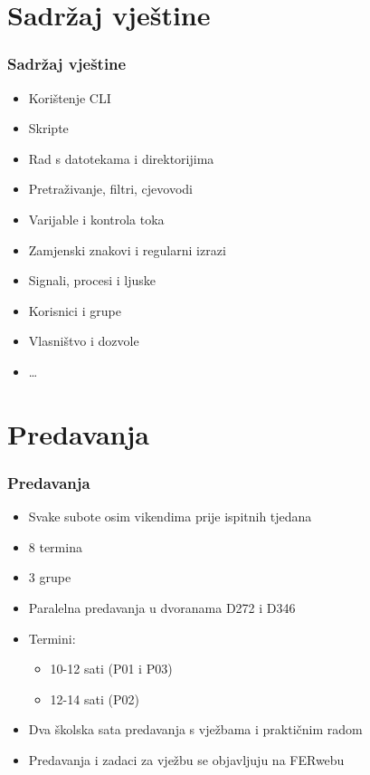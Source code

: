 \documentclass{beamer}
\begin{document}
\section{Sadržaj vještine}
\begin{frame}[t]
	\frametitle{Sadržaj vještine}
	\begin{itemize}
		\item Korištenje CLI
		\item Skripte
		\item Rad s datotekama i direktorijima
		\item Pretraživanje, filtri, cjevovodi
		\item Varijable i kontrola toka
		\item Zamjenski znakovi i regularni izrazi
		\item Signali, procesi i ljuske
		\item Korisnici i grupe
		\item Vlasništvo i dozvole
		\item \ldots
	\end{itemize}
\end{frame}

\section{Predavanja}
\begin{frame}[t]
\frametitle{Predavanja}
\begin{itemize}
	\item Svake subote osim vikendima prije ispitnih tjedana
	\item 8 termina
	\item 3 grupe
	\item Paralelna predavanja u dvoranama D272 i D346
	\item Termini:
	\begin{itemize}
		\item 10-12 sati (P01 i P03)
		\item 12-14 sati (P02)
	\end{itemize}
	\item Dva školska sata predavanja s vježbama i praktičnim radom
	\item Predavanja i zadaci za vježbu se objavljuju na FERwebu
\end{itemize}
\end{frame}
\end{document}
